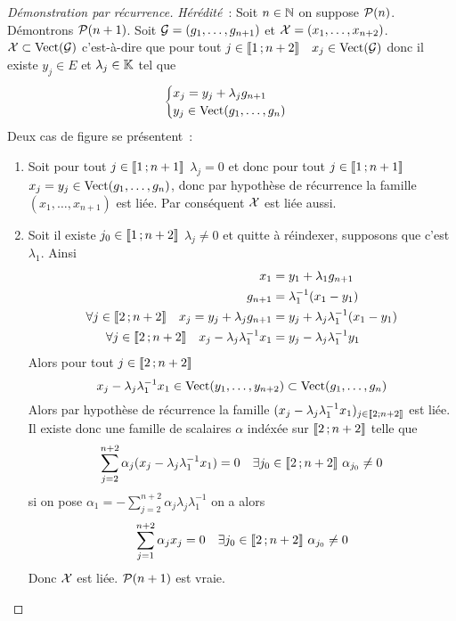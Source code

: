 \begin{proof}[Démonstration par récurrence]
  \emph{Hérédité}~: Soit \(n \in \N\) on suppose \(\P(n)\). Démontrons \(\P(n+1)\). Soit \(\G=(g_1, \ldots, g_{n+1})\) et \(\X=(x_1, \ldots, x_{n+2})\). \(\X \subset \VectEngendre(\G)\) c'est-à-dire que pour tout \(j \in \intervalleentier{1}{n+2} \quad x_j \in \VectEngendre(\G)\) donc il existe \(y_j \in E\) et \(\lambda_j \in \K\) tel que
  \begin{equation}
    \begin{cases} x_j = y_j + \lambda_j g_{n+1} \\ y_j \in \VectEngendre(g_1, \ldots, g_n) \end{cases}
  \end{equation}
  Deux cas de figure se présentent~:
  \begin{enumerate}
  \item Soit pour tout \(j \in \intervalleentier{1}{n+1}\) \(\lambda_j=0\) et donc pour tout \(j \in \intervalleentier{1}{n+1}\) \(x_j=y_j \in \VectEngendre(g_1, \ldots, g_n)\), donc par hypothèse de récurrence la famille \((x_1, \ldots, x_{n+1})\) est liée. Par conséquent \(\X\) est liée aussi.
  \item Soit il existe \(j_0 \in \intervalleentier{1}{n+2}\) \(\lambda_j \neq 0\) et quitte à réindexer, supposons que c'est \(\lambda_1\). Ainsi
    \begin{align}
      x_1 &= y_1 + \lambda_1 g_{n+1} \\
      g_{n+1} &= \lambda_1^{-1}(x_1-y_1) \\
      \forall j \in \intervalleentier{2}{n+2} \quad x_j = y_j + \lambda_j g_{n+1} &= y_j + \lambda_j \lambda_1^{-1}(x_1-y_1)\\
      \forall j \in \intervalleentier{2}{n+2} \quad x_j - \lambda_j\lambda_1^{-1}x_1 &= y_j - \lambda_j \lambda_1^{-1} y_1
    \end{align}
    Alors pour tout \(j \in \intervalleentier{2}{n+2}\)
    \begin{equation}
      x_j - \lambda_j\lambda_1^{-1}x_1 \in \VectEngendre(y_1, \ldots, y_{n+2}) \subset \VectEngendre(g_1, \ldots, g_n)
    \end{equation}
    Alors par hypothèse de récurrence la famille \((x_j-\lambda_j\lambda_1^{-1}x_1)_{j \in \intervalleentier{2}{n+2}}\) est liée. Il existe donc une famille de scalaires \(\alpha\) indéxée sur \(\intervalleentier{2}{n+2}\) telle que
    \begin{equation}
      \sum_{j=2}^{n+2} \alpha_j (x_j-\lambda_j\lambda_1^{-1}x_1) = 0 \quad \exists j_0 \in \intervalleentier{2}{n+2} \ \alpha_{j_0} \neq 0
    \end{equation}
    si on pose \(\alpha_1=-\sum_{j=2}^{n+2} \alpha_j \lambda_j \lambda_1^{-1}\) on a alors
    \begin{equation}
      \sum_{j=1}^{n+2} \alpha_j x_j =0 \quad \exists j_0 \in \intervalleentier{2}{n+2} \ \alpha_{j_0} \neq 0
    \end{equation}
    Donc \(\X\) est liée. \(\P(n+1)\) est vraie.
  \end{enumerate}


\end{proof}
